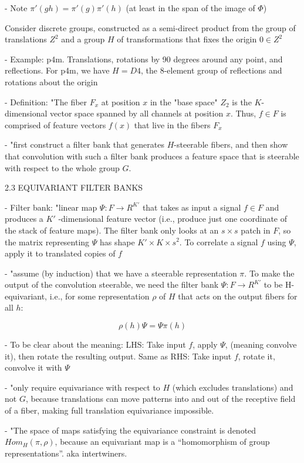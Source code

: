 \documentclass[english]{article}
\begin{document}
- Note $\pi'(gh) = \pi'(g)\pi'(h)$ (at least in the span of the image of $\Phi$)

\item Consider discrete groups, constructed as a semi-direct product  from the group of translations $Z^2$ and a group $H$ of transformations that fixes the origin $0 \in Z^2$

- Example: p4m. Translations, rotations by 90 degrees around any point, and reflections.  For p4m, we have $H = D4$, the 8-element group
of reflections and rotations about the origin

- Definition: "The fiber $F_x$ at position $x$ in the "base space" $Z_2$ is the $K$-dimensional vector space spanned by all channels at position $x$. Thus,
$f \in F$ is comprised of feature vectors $f(x)$ that live in the fibers $F_x$


-  "first construct a filter bank that generates $H$-steerable fibers, and then
show that convolution with such a filter bank produces a feature space that is steerable with respect
to the whole group $G$.

\item 2.3 EQUIVARIANT FILTER BANKS

-  Filter bank: "linear map $\Psi : F \to R^{K'}$ that takes as input a signal $f \in F$ and produces a $K'$ -dimensional feature vector (i.e., produce just one coordinate of the stack of feature maps). The filter bank only looks at an $s \times s$ patch in $F$, so the matrix representing $\Psi$ has shape $K' \times K \times s^2$. To correlate a signal $f$ using $\Psi$, apply it to translated copies of $f$

- "assume (by induction) that we have a steerable representation $\pi$. To make
the output of the convolution steerable, we need the filter bank $\Psi : F \to R^{K'}$
to be H-equivariant, i.e., for some representation $\rho$ of $H$ that acts on the output fibers for all $h$:

$$\rho(h)\Psi = \Psi \pi(h)$$

- To be clear about the meaning: LHS: Take input $f$, apply $\Psi$, (meaning convolve it), then rotate the resulting output. Same as RHS: Take input $f$, rotate it, convolve it with $\Psi$


- "only require equivariance with
respect to $H$ (which excludes translations) and not $G$, because
translations can move patterns into and out of the receptive
field of a fiber, making full translation equivariance impossible.  

- "The space of maps satisfying the equivariance constraint is denoted $Hom_H(\pi,\rho)$, because an equivariant map is a “homomorphism of group representations”. aka intertwiners.
\end{document}
